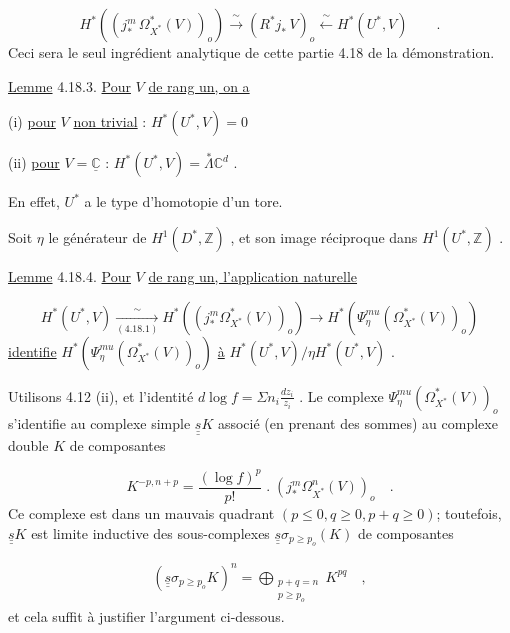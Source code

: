 \begin{equation}\tag{4.18.2}
H^*((j_*^m\, \Omega^*_{X^*}(V))_o) \xrightarrow{\ \sim\ } (R^*j_*\, V)_o \xleftarrow{\ \sim\ } H^*(U^*, V) \qquad .
\end{equation}
Ceci sera le seul ingrédient analytique de cette partie 4.18 de la démonstration.

\underline{Lemme} 4.18.3. \underline{Pour} $V$ \underline{de rang un, on a}

(i) \qquad \underline{pour} $V$ \underline{non trivial} : $H^*(U^*, V) = 0$



 (ii) \underline{pour} $V = \underline{\mathbb{C}}$ : $H^*(U^*, V) = \stackrel{*}{\Lambda} \mathbb{C}^d$ .

En effet, $U^*$ a le type d'homotopie d'un tore.

Soit $\eta$ le générateur de $H^1(D^*, \mathbb{Z})$ , et son image réciproque dans $H^1(U^*, \mathbb{Z})$ .

\underline{Lemme} 4.18.4. \underline{Pour} $V$ \underline{de rang un, l'application naturelle}

\begin{equation*}
H^*(U^*, V) \xrightarrow[(4.18.1)]{\sim} H^*((j^m_* \Omega^*_{X^*}(V))_o) \longrightarrow H^*(\Psi^{mu}_{\eta}(\Omega^*_{X^*}(V))_o)
\end{equation*}
\underline{identifie} $H^*(\Psi^{mu}_{\eta}(\Omega^*_{X^*}(V))_o)$ \underline{à} $H^*(U^*, V)/\eta H^*(U^*, V)$ .

Utilisons 4.12 (ii), et l'identité $d \log f = \Sigma n_i \frac{dz_i}{z_i}$ . Le complexe $\Psi^{mu}_{\eta}(\Omega^*_{X^*}(V))_o$ s'identifie au complexe simple $\underline{\underline{s}} K$ associé (en prenant des sommes) au complexe double $K$ de composantes

\begin{equation*}
K^{-p,n+p} = \frac{(\log f)^p}{p!} \; . \; (j^m_* \Omega^n_{X^*}(V))_o \quad .
\end{equation*}
Ce complexe est dans un mauvais quadrant $(p \leqslant 0, q \geqslant 0, p+q \geqslant 0)$; toutefois, $\underline{\underline{s}} K$ est limite inductive des sous-complexes $\underline{\underline{s}} \sigma_{p \geqslant p_o}(K)$ de composantes

\begin{multline*}
(\underline{\underline{s}} \sigma_{p \geqslant p_o} K)^n = \bigoplus_{\substack{p+q=n \\ p \geqslant p_o}} K^{pq} \quad ,
\end{multline*}
et cela suffit à justifier l'argument ci-dessous.

